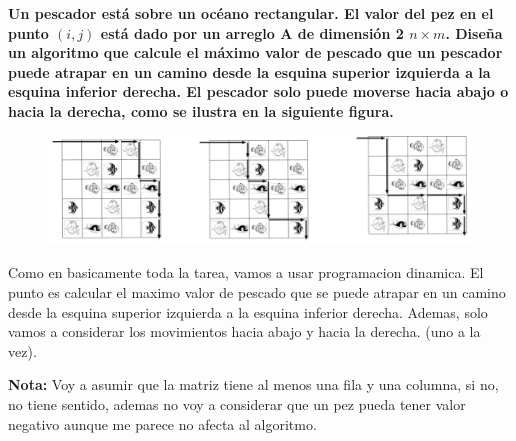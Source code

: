 \textbf{Un pescador est\'a sobre un oc\'eano rectangular. El valor del pez en el punto $(i, j)$ est\'a dado por un arreglo A de dimensi\'on 2 $n \times m$. Dise\~na un algoritmo que calcule el m\'aximo valor de pescado que un pescador puede atrapar en un camino desde la esquina superior izquierda a la esquina inferior derecha. El pescador solo puede moverse hacia abajo o hacia la derecha, como se ilustra en la siguiente figura.}\vspace{.2cm}

\begin{figure}[H]
    \centering
    \includegraphics[width=0.75\linewidth]{src/Img/lago.PNG}
\end{figure}

Como en basicamente toda la tarea, vamos a usar programacion dinamica. El punto es calcular el maximo valor de pescado que se puede atrapar en un camino desde la esquina superior izquierda a la esquina inferior derecha. Ademas, solo vamos a considerar los movimientos hacia abajo y hacia la derecha. (uno a la vez). \vspace{.2cm}

\textbf{Nota:} Voy a asumir que la matriz tiene al menos una fila y una columna, si no, no tiene sentido, ademas no voy a considerar que un pez pueda tener valor negativo aunque me parece no afecta al algoritmo. \vspace{.2cm}

